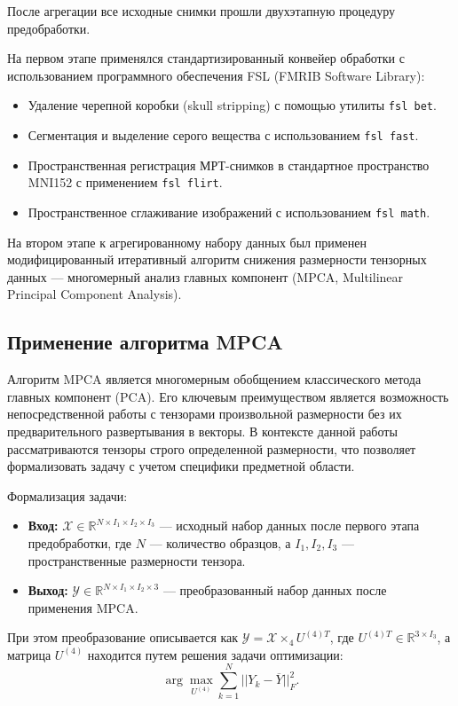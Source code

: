 \documentclass[eqsecnum, authorsinfo]{kioj6}
\begin{document}
После агрегации все исходные снимки прошли двухэтапную процедуру предобработки. 

На первом этапе применялся стандартизированный конвейер обработки с использованием программного обеспечения FSL (FMRIB Software Library):
\begin{itemize}
    \item Удаление черепной коробки (skull stripping) с помощью утилиты \texttt{fsl bet}.
    \item Сегментация и выделение серого вещества с использованием \texttt{fsl fast}.
    \item Пространственная регистрация МРТ-снимков в стандартное пространство MNI152 с применением \texttt{fsl flirt}.
    \item Пространственное сглаживание изображений с использованием \texttt{fsl math}.
\end{itemize}

На втором этапе к агрегированному набору данных был применен модифицированный итеративный алгоритм снижения размерности тензорных данных --- многомерный анализ главных компонент (MPCA, Multilinear Principal Component Analysis).

\subsection{Применение алгоритма MPCA}

Алгоритм MPCA \cite{6} является многомерным обобщением классического метода главных компонент (PCA\cite{pca}). Его ключевым преимуществом является возможность непосредственной работы с тензорами произвольной размерности без их предварительного развертывания в векторы. В контексте данной работы рассматриваются тензоры строго определенной размерности, что позволяет формализовать задачу с учетом специфики предметной области.

Формализация задачи:
\begin{itemize}
    \item \textbf{Вход:} $\mathcal{X} \in \mathbb{R}^{N \times I_1 \times I_2 \times I_3}$ --- исходный набор данных после первого этапа предобработки, где $N$ --- количество образцов, а $I_1, I_2, I_3$ --- пространственные размерности тензора.
    \item \textbf{Выход:} $\mathcal{Y} \in \mathbb{R}^{N \times I_1 \times I_2 \times 3}$ --- преобразованный набор данных после применения MPCA.
\end{itemize}

При этом преобразование описывается как $\mathcal{Y} = \mathcal{X} \times_4 U^{(4)T}$, где $U^{(4)T} \in \mathbb{R}^{3 \times I_3}$, а матрица $U^{(4)}$ находится путем решения задачи оптимизации:
\begin{equation}
    \arg\max_{U^{(4)}} \sum_{k=1}^{N} ||Y_k - \overline{Y}||^2_{F}.
\end{equation}
\end{document}
